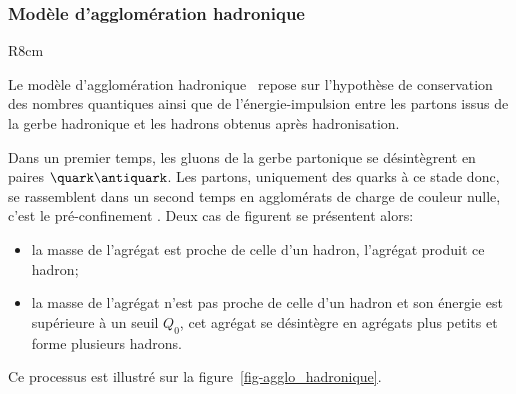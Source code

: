 \subsubsection{Modèle d'agglomération hadronique}\label{chapter-JERC-section-jets-subsec-hadronisation-subsubsec-agglo_hadronique}
\begin{wrapfigure}{R}{8cm}
\centering

\caption[Formation de jets dans le cadre du modèle d'agglomération hadronique.]{Schématisation de l'hadronisation dans le cadre du modèle d'agglomération hadronique.}
\label{fig-agglo_hadronique}
\end{wrapfigure}
Le modèle d'agglomération hadronique~\cite{Winter_2004} repose sur l'hypothèse de conservation des nombres quantiques ainsi que de l'énergie-impulsion entre les partons issus de la gerbe hadronique et les hadrons obtenus après hadronisation.
\par Dans un premier temps, les gluons de la gerbe partonique se désintègrent en paires $\quark\antiquark$. Les partons, uniquement des quarks à ce stade donc, se rassemblent dans un second temps en agglomérats de charge de couleur nulle, c'est le \og pré-confinement \fg.
Deux cas de figurent se présentent alors:
\begin{itemize}
\item la masse de l'agrégat est proche de celle d'un hadron, l'agrégat produit ce hadron;
\item la masse de l'agrégat n'est pas proche de celle d'un hadron et son énergie est supérieure à un seuil $Q_0$, cet agrégat se désintègre en agrégats plus petits et forme plusieurs hadrons.
\end{itemize}
Ce processus est illustré sur la figure~\ref{fig-agglo_hadronique}.
